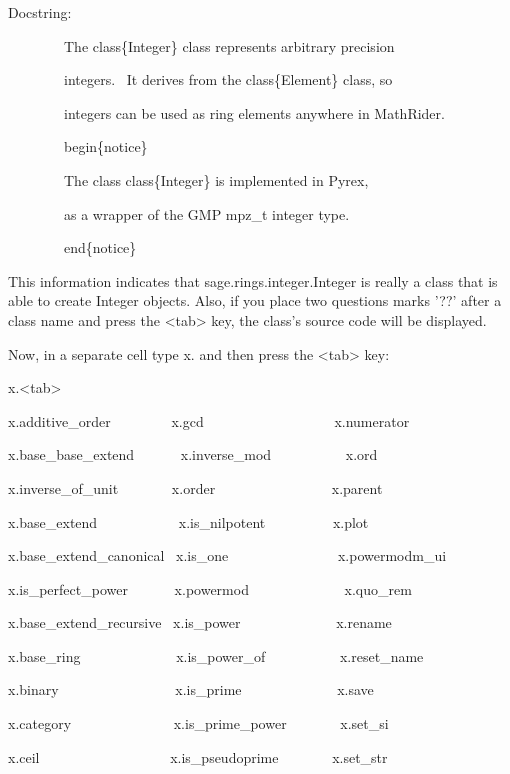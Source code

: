 \documentclass[12pt,oneside]{book}
\begin{document}
Docstring: 


\ \ \ \ \ \ \ \ The class\{Integer\} class represents arbitrary precision 

\ \ \ \ \ \ \ \ integers. \ It derives from the class\{Element\} class, so 

\ \ \ \ \ \ \ \ integers can be used as ring elements anywhere in MathRider. 


\ \ \ \ \ \ \ \ begin\{notice\} 

\ \ \ \ \ \ \ \ The class class\{Integer\} is implemented in Pyrex, 

\ \ \ \ \ \ \ \ as a wrapper of the GMP mpz\_t integer type. 

\ \ \ \ \ \ \ \ end\{notice\} 


This information indicates that sage.rings.integer.Integer is really a class that is able to create Integer objects. Also, if you place two questions marks '??' after a class name and press the {\textless}tab{\textgreater} key, the class's source code will be displayed. 

Now, in a separate cell type x. and then press the {\textless}tab{\textgreater} key: 

x.{\textless}tab{\textgreater}

{\textbar}

x.additive\_order \ \ \ \ \ \ \ \ x.gcd
\ \ \ \ \ \ \ \ \ \ \ \ \ \ \ \ \ \ x.numerator

x.base\_base\_extend \ \ \ \ \ \ x.inverse\_mod
\ \ \ \ \ \ \ \ \ \ x.ord

x.inverse\_of\_unit \ \ \ \ \ \ \ x.order
\ \ \ \ \ \ \ \ \ \ \ \ \ \ \ \ x.parent

x.base\_extend \ \ \ \ \ \ \ \ \ \ \ x.is\_nilpotent
\ \ \ \ \ \ \ \ \ x.plot

x.base\_extend\_canonical \ x.is\_one
\ \ \ \ \ \ \ \ \ \ \ \ \ \ \ x.powermodm\_ui

x.is\_perfect\_power \ \ \ \ \ \ x.powermod
\ \ \ \ \ \ \ \ \ \ \ \ \ x.quo\_rem

x.base\_extend\_recursive \ x.is\_power
\ \ \ \ \ \ \ \ \ \ \ \ \ x.rename

x.base\_ring \ \ \ \ \ \ \ \ \ \ \ \ \ x.is\_power\_of
\ \ \ \ \ \ \ \ \ \ x.reset\_name

x.binary \ \ \ \ \ \ \ \ \ \ \ \ \ \ \ \ x.is\_prime
\ \ \ \ \ \ \ \ \ \ \ \ \ x.save

x.category \ \ \ \ \ \ \ \ \ \ \ \ \ \ x.is\_prime\_power
\ \ \ \ \ \ \ x.set\_si

x.ceil \ \ \ \ \ \ \ \ \ \ \ \ \ \ \ \ \ \ x.is\_pseudoprime
\ \ \ \ \ \ \ x.set\_str
\end{document}
